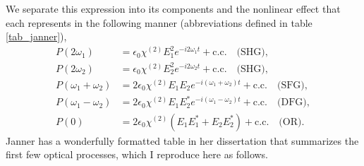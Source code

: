 We separate this expression into its components and the nonlinear effect that
each represents in the following manner (abbreviations defined in table
\ref{tab_janner}),
\begin{equation}\label{eq_list}
\begin{split}
P(2\omega_{1}) 
&= \epsilon_{0}\chi^{(2)}E^{2}_{1}e^{-i2\omega_{1}t}
 + \text{c.c.}\quad\text{(SHG)},\\
P(2\omega_{2})
&= \epsilon_{0}\chi^{(2)}E^{2}_{2}e^{-i2\omega_{2}t}
 + \text{c.c.}\quad\text{(SHG)},\\
P(\omega_{1}+\omega_{2})
&= 2\epsilon_{0}\chi^{(2)}E_{1}E_{2}e^{-i(\omega_{1}+\omega_{2})t}
 + \text{c.c.}\quad\text{(SFG)},\\
P(\omega_{1}-\omega_{2})
&= 2\epsilon_{0}\chi^{(2)}E_{1}E^{\ast}_{2}e^{-i(\omega_{1}-\omega_{2})t}
 + \text{c.c.}\quad\text{(DFG)},\\
P(0)
&= 2\epsilon_{0}\chi^{(2)}\left(E_{1}E^{\ast}_{1}
 + E_{2}E^{\ast}_{2}\right) + \text{c.c.}\quad\text{(OR)}.
\end{split}
\end{equation}
Janner \cite{janner1998exciton} has a wonderfully formatted table in her
dissertation that summarizes the first few optical processes, which I reproduce
here as follows.
